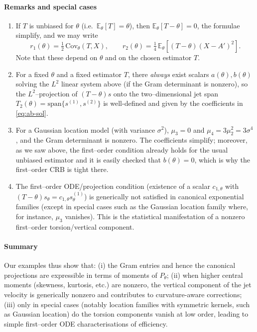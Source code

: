 \documentclass[3p,times]{elsarticle}
\begin{document}
\paragraph{Remarks and special cases}
\begin{enumerate}
\item If $T$ is unbiased for \(\theta\) (i.e.\ \(\mathbb{E}_\theta[T]=\theta\)),
then $\mathbb{E}_\theta[T-\theta]=0$, the formulae simplify, and we may write
\[
r_1(\theta)=\tfrac12\,\mathrm{Cov}_\theta(T,X),\qquad
r_2(\theta)=\tfrac14\,\mathbb{E}_\theta[(T-\theta)(X-A')^2].
\]
Note that these depend on $\theta$ and on the chosen estimator $T$.
\item For a fixed $\theta$ and a fixed estimator $T$, there \emph{always}
exist scalars $a(\theta),b(\theta)$ solving the $L^2$ linear system above (if
the Gram determinant is nonzero), so the $L^2$--projection of $(T-\theta)s$
onto the two--dimensional jet span $T_2(\theta)=\mathrm{span}\{s^{(1)},s^{(2)}\}$ is
well-defined and given by the coefficients in \eqref{eq:ab-sol}.  
\item 
For a Gaussian location model (with variance $\sigma^2$), $\mu_3=0$ and
$\mu_4=3\mu_2^2=3\sigma^4$, and the Gram determinant is nonzero.  The
coefficients simplify; moreover, as we saw above, the first--order
condition already holds for the usual unbiased estimator and it is easily checked that \(b(\theta)=0\), which is why the first--order CRB is tight there.
\item The first--order ODE/projection condition (existence of a scalar
$c_{1,\theta}$ with $(T-\theta)s_\theta=c_{1,\theta}s_\theta^{(1)}$) is
generically not satisfied in canonical exponential families (except in
special cases such as the Gaussian location family where, for instance, \(\mu_3\) vanishes).  This is the statistical
manifestation of a nonzero first--order torsion/vertical component.
\end{enumerate}

\paragraph{Summary}
Our examples thus show that: (i) the Gram entries and hence the canonical projections are expressible in terms of moments of $P_\theta$; (ii) when higher central moments (skewness, kurtosis, etc.) are nonzero, the vertical component of the jet velocity is generically nonzero and contributes to curvature-aware corrections; (iii) only in special cases (notably location families with symmetric kernels, such as Gaussian location) do the torsion components vanish at low order, leading to simple first--order ODE characterisations of efficiency.
\end{document}
